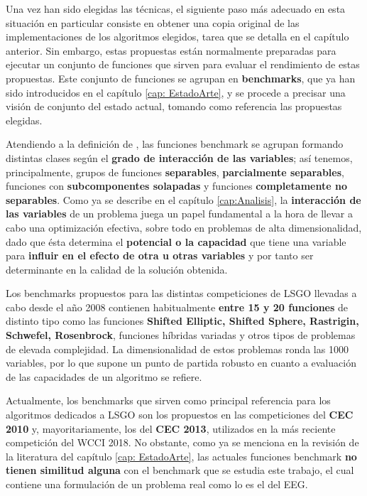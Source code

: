 Una vez han sido elegidas las técnicas, el siguiente paso más adecuado en esta situación en particular consiste en obtener una copia original de las implementaciones de los algoritmos elegidos, tarea que se detalla en el capítulo anterior. Sin embargo, estas propuestas están normalmente preparadas para ejecutar un conjunto de funciones que sirven para evaluar el rendimiento de estas propuestas. Este conjunto de funciones se agrupan en \textbf{benchmarks}, que ya han sido introducidos en el capítulo \ref{cap: EstadoArte}, y se procede a precisar una visión de conjunto del estado actual, tomando como referencia las propuestas elegidas.

Atendiendo a la definición de \cite{ELSGOI}, las funciones benchmark se agrupan formando distintas clases según el \textbf{grado de interacción de las variables}; así tenemos, principalmente, grupos de funciones \textbf{separables}, \textbf{parcialmente separables}, funciones con \textbf{subcomponentes solapadas} y funciones \textbf{completamente no separables}. Como ya se describe en el capítulo \ref{cap:Analisis}, la \textbf{interacción de las variables} de un problema juega un papel fundamental a la hora de llevar a cabo una optimización efectiva, sobre todo en problemas de alta dimensionalidad, dado que ésta determina el \textbf{potencial o la capacidad} que tiene una variable para  \textbf{influir en el efecto de otra u otras variables} y por tanto ser determinante en la calidad de la solución obtenida.  

Los benchmarks propuestos para las distintas competiciones de LSGO llevadas a cabo desde el año 2008 contienen habitualmente \textbf{entre 15 y 20 funciones} de distinto tipo como las funciones \textbf{Shifted Elliptic, Shifted Sphere, Rastrigin, Schwefel, Rosenbrock}, funciones híbridas variadas y otros tipos de problemas de elevada complejidad\cite{ComprehensiveComparison}. La dimensionalidad de estos problemas ronda las 1000 variables, por lo que supone un punto de partida robusto en cuanto a evaluación de las capacidades  de un algoritmo se refiere.

Actualmente, los benchmarks que sirven como principal referencia para los algoritmos dedicados a LSGO son los propuestos en las competiciones del \textbf{CEC 2010} y, mayoritariamente, los del \textbf{CEC 2013}\cite{CEC2013}, utilizados en la más reciente competición del WCCI 2018\cite{WCCI-SHADEILS}. No obstante, como ya se menciona en la revisión de la literatura del capítulo \ref{cap: EstadoArte}, las actuales funciones benchmark \textbf{no tienen similitud alguna} con el benchmark que se estudia este trabajo, el cual contiene una formulación de un problema real como lo es el del EEG.

